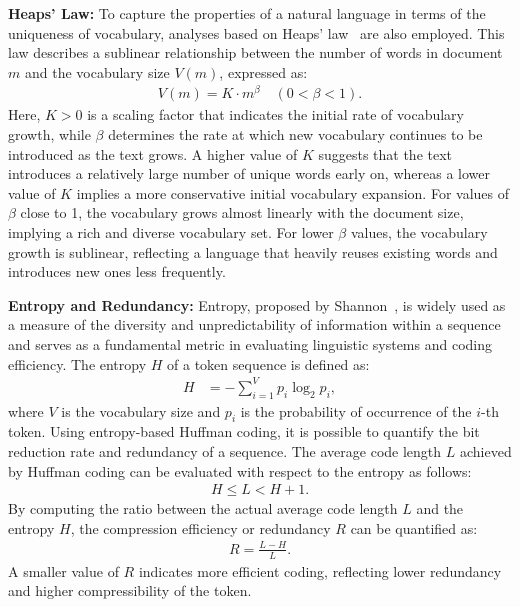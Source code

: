 \documentclass[conference]{IEEEtran}
\begin{document}
\vspace{0.5em}\noindent\textbf{Heaps' Law:\:}
To capture the properties of a natural language in terms of the uniqueness of vocabulary, analyses based on Heaps' law~\cite{heaps1978information} are also employed. This law describes a sublinear relationship between the number of words in document \( m \) and the vocabulary size \( V(m) \), expressed as:
\vspace{-1mm}
\begin{align}
V(m) = K \cdot m^{\beta} \quad (0 < \beta < 1).
\end{align}
Here, \( K > 0 \) is a scaling factor that indicates the initial rate of vocabulary growth, while \( \beta \) determines the rate at which new vocabulary continues to be introduced as the text grows. A higher value of \( K \) suggests that the text introduces a relatively large number of unique words early on, whereas a lower value of \( K \) implies a more conservative initial vocabulary expansion. For values of  \( \beta \) close to 1, the vocabulary grows almost linearly with the document size, implying a rich and diverse vocabulary set. For lower \( \beta \) values, the vocabulary growth is sublinear, reflecting a language that heavily reuses existing words and introduces new ones less frequently.

\vspace{0.5em}\noindent\textbf{Entropy and Redundancy:\:}
Entropy, proposed by Shannon~\cite{shannon1951prediction}, is widely used as a measure of the diversity and unpredictability of information within a sequence and serves as a fundamental metric in evaluating linguistic systems and coding efficiency. The entropy $H$ of a token sequence is defined as:
\vspace{-2mm}
\begin{align}
H &= -\sum_{i=1}^{V} p_i \log_2 p_i,
\end{align}
where $V$ is the vocabulary size and $p_i$ is the probability of occurrence of the $i$-th token. Using entropy-based Huffman coding, it is possible to quantify the bit reduction rate and redundancy of a sequence. The average code length $L$ achieved by Huffman coding can be evaluated with respect to the entropy as follows:
\vspace{-1mm}
\begin{align}
H \leq L < H + 1.
\end{align}
By computing the ratio between the actual average code length $L$ and the entropy $H$, the compression efficiency or redundancy $R$ can be quantified as:
\vspace{-1mm}
\begin{align}
R = \frac{L - H}{L}.
\end{align}
A smaller value of $R$ indicates more efficient coding, reflecting lower redundancy and higher compressibility of the token.
\vspace{-2mm}
\end{document}
